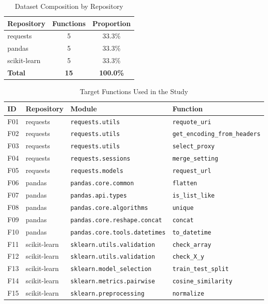 \begin{table}[ht]
\centering
\caption{Dataset Composition by Repository}
\label{tab:dataset-composition}
\begin{tabular}{lcc}
\toprule
Repository & Functions & Proportion \\
\midrule
requests & 5 & 33.3\% \\
pandas & 5 & 33.3\% \\
scikit-learn & 5 & 33.3\% \\
\midrule
\textbf{Total} & \textbf{15} & \textbf{100.0\%} \\
\bottomrule
\end{tabular}
\end{table}



\begin{table}[ht]
\centering
\caption{Target Functions Used in the Study}
\label{tab:target-functions}
\begin{tabular}{llll}
\toprule
ID & Repository & Module & Function \\
\midrule
F01 & requests & \texttt{requests.utils} & \texttt{requote\_uri} \\
F02 & requests & \texttt{requests.utils} & \texttt{get\_encoding\_from\_headers} \\
F03 & requests & \texttt{requests.utils} & \texttt{select\_proxy} \\
F04 & requests & \texttt{requests.sessions} & \texttt{merge\_setting} \\
F05 & requests & \texttt{requests.models} & \texttt{request\_url} \\
F06 & pandas & \texttt{pandas.core.common} & \texttt{flatten} \\
F07 & pandas & \texttt{pandas.api.types} & \texttt{is\_list\_like} \\
F08 & pandas & \texttt{pandas.core.algorithms} & \texttt{unique} \\
F09 & pandas & \texttt{pandas.core.reshape.concat} & \texttt{concat} \\
F10 & pandas & \texttt{pandas.core.tools.datetimes} & \texttt{to\_datetime} \\
F11 & scikit-learn & \texttt{sklearn.utils.validation} & \texttt{check\_array} \\
F12 & scikit-learn & \texttt{sklearn.utils.validation} & \texttt{check\_X\_y} \\
F13 & scikit-learn & \texttt{sklearn.model\_selection} & \texttt{train\_test\_split} \\
F14 & scikit-learn & \texttt{sklearn.metrics.pairwise} & \texttt{cosine\_similarity} \\
F15 & scikit-learn & \texttt{sklearn.preprocessing} & \texttt{normalize} \\
\bottomrule
\end{tabular}
\end{table}



